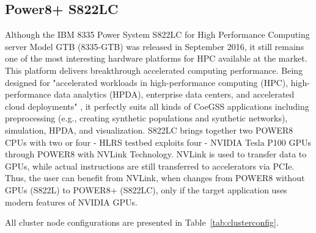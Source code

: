 \subsection{Power8+ S822LC}
Although the IBM 8335 Power System S822LC for High Performance Computing server Model GTB (8335-GTB) was released in September 2016, it still remains one of the most interesting hardware platforms for HPC available at the market. This platform delivers breakthrough accelerated computing performance. Being designed for "accelerated workloads in high-performance computing (HPC), high-performance data analytics (HPDA), enterprise data centers, and accelerated cloud deployments" \cite{2015:power8} \cite{2016:power8} , it perfectly suits all kinds of CoeGSS applications including preprocessing (e.g., creating synthetic populations and synthetic networks), simulation, HPDA, and visualization.
S822LC brings together two POWER8 CPUs with two or four - HLRS testbed exploits four - NVIDIA Tesla P100 GPUs through POWER8 with NVLink Technology. NVLink is used to transfer data to GPUs, while actual instructions are still transferred to accelerators via PCIe. Thus, the user can benefit from NVLink, when changes from POWER8 without GPUs (S822L) to POWER8+ (S822LC), only if the target application uses modern features of NVIDIA GPUs. 

All cluster node configurations are presented in Table~\ref{tab:clusterconfig}.